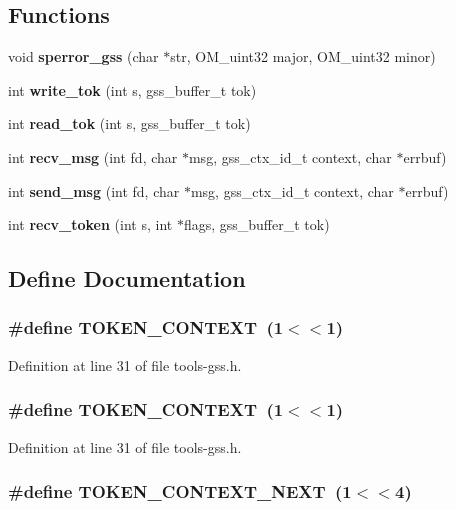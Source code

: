 \subsection*{Functions}
\begin{CompactItemize}
\item 
void {\bf sperror\_\-gss} (char $\ast$str, OM\_\-uint32 major, OM\_\-uint32 minor)
\item 
int {\bf write\_\-tok} (int s, gss\_\-buffer\_\-t tok)
\item 
int {\bf read\_\-tok} (int s, gss\_\-buffer\_\-t tok)
\item 
int {\bf recv\_\-msg} (int fd, char $\ast$msg, gss\_\-ctx\_\-id\_\-t context, char $\ast$errbuf)
\item 
int {\bf send\_\-msg} (int fd, char $\ast$msg, gss\_\-ctx\_\-id\_\-t context, char $\ast$errbuf)
\item 
int {\bf recv\_\-token} (int s, int $\ast$flags, gss\_\-buffer\_\-t tok)
\end{CompactItemize}


\subsection{Define Documentation}
\subsubsection{\setlength{\rightskip}{0pt plus 5cm}\#define TOKEN\_\-CONTEXT\ (1$<$$<$1)}\label{tools-gss_8h_a9}




Definition at line 31 of file tools-gss.h.
\subsubsection{\setlength{\rightskip}{0pt plus 5cm}\#define TOKEN\_\-CONTEXT\ (1$<$$<$1)}\label{tools-gss_8h_a1}




Definition at line 31 of file tools-gss.h.
\subsubsection{\setlength{\rightskip}{0pt plus 5cm}\#define TOKEN\_\-CONTEXT\_\-NEXT\ (1$<$$<$4)}\label{tools-gss_8h_a12}




